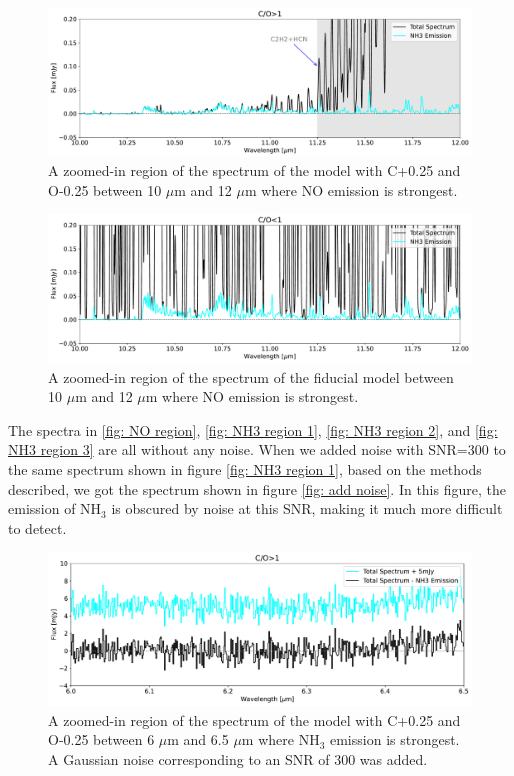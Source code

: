 \documentclass[twoside, single, authoryear, semicolon, 12pt]{lion-msc}
\newcommand{\4}{$_4$}
\newcommand{\3}{$_3$}
\newcommand{\2}{$_2$}
\begin{document}
\begin{figure}[H]
    \centering
    \includegraphics[width=\linewidth]{Figures/NH3_region2.pdf}
    \caption{A zoomed-in region of the spectrum of the model with C+0.25 and O-0.25 between 10 $\mu$m and 12 $\mu$m where NO emission is strongest.}
    \label{fig: NH3 region 2}
\end{figure}

\lipsum[2]

\begin{figure}[H]
    \centering
    \includegraphics[width=\linewidth]{Figures/NH3_region3.pdf}
    \caption{A zoomed-in region of the spectrum of the fiducial model between 10 $\mu$m and 12 $\mu$m where NO emission is strongest.}
    \label{fig: NH3 region 3}
\end{figure}

The spectra in \autoref{fig: NO region}, \autoref{fig: NH3 region 1}, \autoref{fig: NH3 region 2}, and \autoref{fig: NH3 region 3} are all without any noise. When we added noise with SNR=300 to the same spectrum shown in figure \autoref{fig: NH3 region 1}, based on the methods described, we got the spectrum shown in figure \autoref{fig: add noise}. In this figure, the emission of NH\3 is obscured by noise at this SNR, making it much more difficult to detect.  

\begin{figure}[H]
    \centering
    \includegraphics[width=\linewidth]{Figures/AddNoise.pdf}
    \caption{A zoomed-in region of the spectrum of the model with C+0.25 and O-0.25 between 6 $\mu$m and 6.5 $\mu$m where NH\3 emission is strongest. A Gaussian noise corresponding to an SNR of 300 was added.}
    \label{fig: add noise}
\end{figure}
\end{document}
